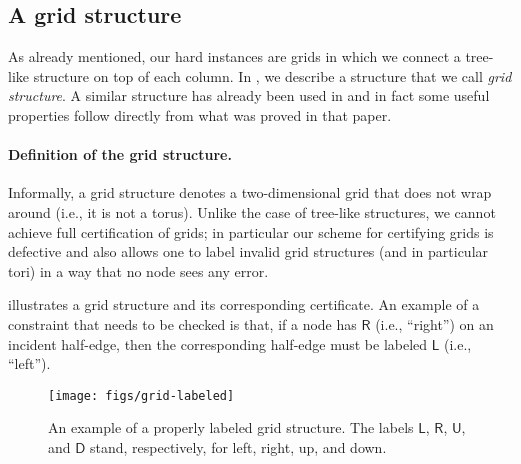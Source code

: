 \documentclass[11pt]{article}
\newcommand{\lleft}{\mathsf {L}}
\newcommand{\lright}{\mathsf {R}}
\newcommand{\lup}{\mathsf {U}}
\newcommand{\ldown}{\mathsf {D}}
\begin{document}
\subsection{A grid structure}\label{ssec:roadmap:grid}
As already mentioned, our hard instances are grids in which we connect a
tree-like structure on top of each column. In , we describe a
structure that we call \emph{grid structure}.
A similar structure has already been used in \cite{congest-lcls} and in fact
some useful properties follow directly from what was proved in that paper.


\paragraph{Definition of the grid structure.}
Informally, a grid structure denotes a two-dimensional grid that does not
wrap around (i.e., it is not a torus). Unlike the case of tree-like
structures, we cannot achieve full certification of grids; in particular our
scheme for certifying grids is defective and also allows one to label invalid
grid structures (and in particular tori) in a way that no node sees any error. 

 illustrates a grid structure and its corresponding
certificate.
An example of a constraint that needs to be checked is that, if a node has
$\lright$ (i.e., ``right'') on an incident half-edge, then the corresponding
half-edge must be labeled $\lleft$ (i.e., ``left'').

\begin{figure}
	\centering
	\texttt{[image: figs/grid-labeled]}
	\caption{An example of a properly labeled grid structure. The labels $\lleft$, $\lright$, $\lup$, and $\ldown$ stand, respectively, for left, right, up, and down.}\label{fig:grid-labeled}
\end{figure}
\end{document}
